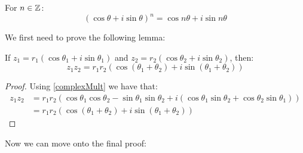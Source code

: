 \documentclass[../main.tex]{subfiles}
\begin{document}
\begin{theorem}
  For $n \in \mathbb{Z}$:
  \[
    (\cos \theta + i \sin \theta)^n = \cos n\theta + i \sin n\theta
  \]
\end{theorem}
We first need to prove the following lemma:
\begin{lemma}
  If $z_1 = r_1(\cos \theta_1 + i \sin \theta_1)$ and $z_2 = r_2(\cos \theta_2 + i \sin \theta_2)$, then:
  \[
    z_1 z_2 = r_1 r_2 (\cos (\theta_1 + \theta_2) + i\sin(\theta_1 + \theta_2))
  \]
  \label{multLemma}
\end{lemma}
\begin{proof}
  Using \cref{complexMult} we have that:
  \begin{align*}
    z_1 z_2 &= r_1 r_2 (\cos \theta_1 \cos \theta_2 - \sin \theta_1 \sin \theta_2 + i(\cos \theta_1 \sin \theta_2 + \cos \theta_2 \sin \theta_1)) \\
            &= r_1 r_2 (\cos(\theta_1 + \theta_2) + i\sin(\theta_1 + \theta_2))
  \end{align*}
\end{proof}
Now we can move onto the final proof:
\end{document}
